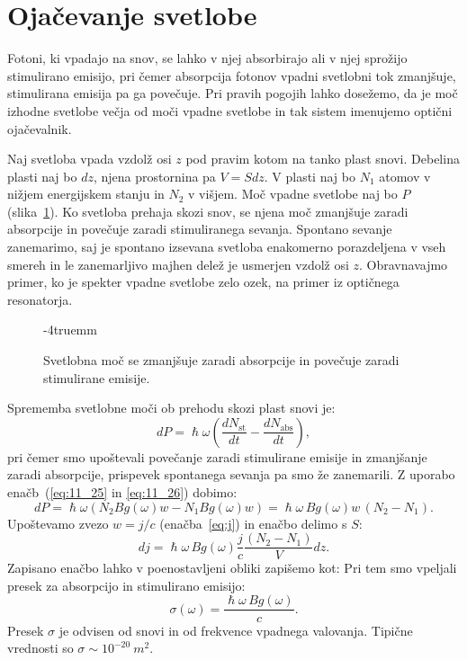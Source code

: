 \section{Ojačevanje svetlobe}
Fotoni, ki vpadajo na snov, se lahko v njej absorbirajo ali v njej sprožijo
stimulirano emisijo, pri čemer absorpcija fotonov vpadni svetlobni tok 
zmanjšuje, stimulirana emisija pa ga povečuje. Pri pravih pogojih lahko
dosežemo, da je moč izhodne svetlobe večja od moči vpadne svetlobe in tak
sistem imenujemo optični ojačevalnik.

Naj svetloba vpada vzdolž osi $z$ pod pravim kotom na tanko plast snovi. 
Debelina plasti naj bo $dz$, njena prostornina pa $V = S dz$. V plasti naj 
bo $N_1$ atomov v nižjem energijskem stanju in $N_2$ v višjem. 
Moč vpadne svetlobe naj bo $P$ (slika~\ref{fig:11_absorpcija}). Ko 
svetloba prehaja skozi snov, se njena moč zmanjšuje zaradi absorpcije 
in povečuje zaradi stimuliranega sevanja. Spontano sevanje 
zanemarimo, saj je spontano izsevana svetloba enakomerno 
porazdeljena v vseh smereh in le zanemarljivo majhen delež je usmerjen 
vzdolž osi $z$. Obravnavajmo primer, ko je spekter vpadne svetlobe
zelo ozek, na primer iz optičnega resonatorja.
\begin{figure}[ht!]
\centering
\def\svgwidth{70truemm} 

\caption{Svetlobna moč se zmanjšuje zaradi absorpcije in povečuje
zaradi stimulirane emisije.}
\vglue-4truemm
\label{fig:11_absorpcija}
\end{figure}

Sprememba svetlobne moči ob prehodu skozi plast snovi je:
\begin{equation}
dP = \hslash \omega \left(\frac{dN_\mathrm{st}}{dt}- 
\frac{dN_\mathrm{abs}}{dt}\right)\!\!,
\label{eq:11_27}
\end{equation}
pri čemer smo upoštevali povečanje zaradi stimulirane emisije in zmanjšanje
zaradi absorpcije, prispevek spontanega sevanja pa smo že zanemarili.
Z uporabo enačb~(\ref{eq:11_25} in \ref{eq:11_26}) dobimo:
\begin{equation}
dP = 
\hslash \omega \left(N_2Bg(\omega) w - N_1Bg(\omega)w\right) = 
\hslash \omega\,B g(\omega) w\, (N_2 - N_1).
\label{eq:11_28}
\end{equation}
Upoštevamo zvezo $w = j/c$ (enačba~\ref{eq:j}) in enačbo delimo s $S$:
\begin{equation}
dj = \hslash \omega\,B g(\omega) \frac{j}{c}\frac{(N_2-N_1)}{V}dz.
\label{eq:11_29}
\end{equation}
Zapisano enačbo lahko v poenostavljeni obliki zapišemo kot:
Pri tem smo vpeljali presek za absorpcijo in stimulirano 
emisijo:
\begin{equation}
\sigma (\omega)= \frac{\hslash \omega\, Bg(\omega)}{c}.
\label{eq:11_30}
\end{equation}
Presek $\sigma$ je odvisen od snovi in od frekvence vpadnega valovanja. 
Tipične vrednosti so $\sigma \sim 10^{-20}~\si{m^2}$.

